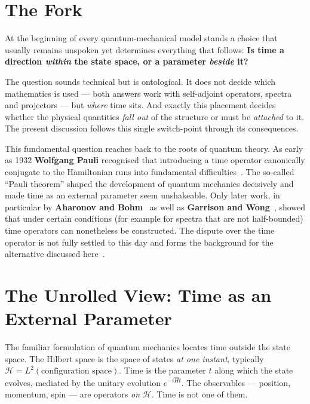 \documentclass[11pt,a4paper]{article}
\begin{document}
\medskip

\section{The Fork}

At the beginning of every quantum-mechanical model stands a choice that usually remains unspoken yet determines everything that follows: \textbf{Is time a direction \emph{within} the state space, or a parameter \emph{beside} it?}

The question sounds technical but is ontological. It does not decide which mathematics is used --- both answers work with self-adjoint operators, spectra and projectors --- but \emph{where} time sits. And exactly this placement decides whether the physical quantities \emph{fall out} of the structure or must be \emph{attached} to it. The present discussion follows this single switch-point through its consequences.

This fundamental question reaches back to the roots of quantum theory. As early as 1932 \textbf{Wolfgang Pauli} recognised that introducing a time operator canonically conjugate to the Hamiltonian runs into fundamental difficulties~\cite{Pauli1933}. The so-called ``Pauli theorem'' shaped the development of quantum mechanics decisively and made time as an external parameter seem unshakeable. Only later work, in particular by \textbf{Aharonov and Bohm}~\cite{AharonovBohm1961} as well as \textbf{Garrison and Wong}~\cite{GarrisonWong1970}, showed that under certain conditions (for example for spectra that are not half-bounded) time operators can nonetheless be constructed. The dispute over the time operator is not fully settled to this day and forms the background for the alternative discussed here~\cite{Muga2008}.

\section{The Unrolled View: Time as an External Parameter}

The familiar formulation of quantum mechanics locates time outside the state space. The Hilbert space is the space of states \emph{at one instant}, typically $\mathcal{H} = L^2(\text{configuration space})$. Time is the parameter $t$ along which the state evolves, mediated by the unitary evolution $e^{-i\hat{H}t}$. The observables --- position, momentum, spin --- are operators \emph{on} $\mathcal{H}$. Time is not one of them.
\end{document}
